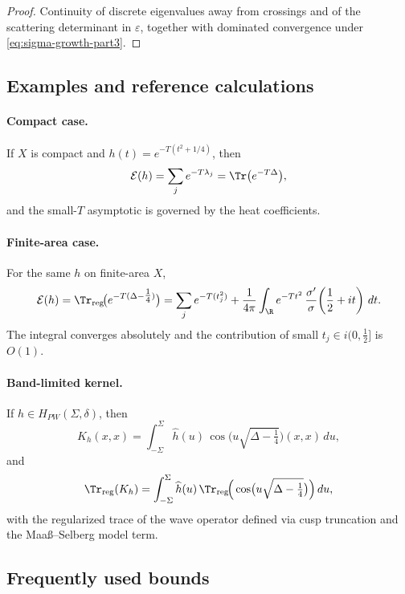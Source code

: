 \begin{proof}
Continuity of discrete eigenvalues away from crossings and of the scattering determinant in $\varepsilon$, together with dominated convergence under \eqref{eq:sigma-growth-part3}.
\end{proof}

\subsection{Examples and reference calculations}
\label{subsec:part3-examples}

\paragraph{Compact case.}
If $X$ is compact and $h(t)=e^{-T(t^2+1/4)}$, then
\[
  \mathcal{E}(h)=\sum_j e^{-T\lambda_j} = \Tr\big(e^{-T\Delta}\big),
\]
and the small-$T$ asymptotic is governed by the heat coefficients.

\paragraph{Finite-area case.}
For the same $h$ on finite-area $X$,
\[
  \mathcal{E}(h)
  = \Tr_{\mathrm{reg}}\!\big(e^{-T(\Delta-\tfrac14)}\big)
  = \sum_j e^{-T(t_j^2)} + \frac{1}{4\pi}\int_{\R} e^{-Tt^2}\,
     \frac{\sigma'}{\sigma}\!\left(\frac12+it\right)\,dt.
\]
The integral converges absolutely and the contribution of small $t_j\in i(0,\tfrac12]$ is $O(1)$.

\paragraph{Band-limited kernel.}
If $h\in H_{PW}(\Sigma,\delta)$, then
\[
  K_h(x,x) = \int_{-\Sigma}^{\Sigma} \widehat h(u)\,
             \cos\!\Big(u\sqrt{\Delta-\tfrac14}\Big)(x,x)\,du,
\]
and
\[
  \Tr_{\mathrm{reg}}(K_h) = \int_{-\Sigma}^{\Sigma} \widehat h(u)\,
             \Tr_{\mathrm{reg}}\!\Big(\cos\!\big(u\sqrt{\Delta-\tfrac14}\big)\Big)\,du,
\]
with the regularized trace of the wave operator defined via cusp truncation and the Maaß–Selberg model term.

\subsection{Frequently used bounds}
\label{subsec:part3-bounds}

